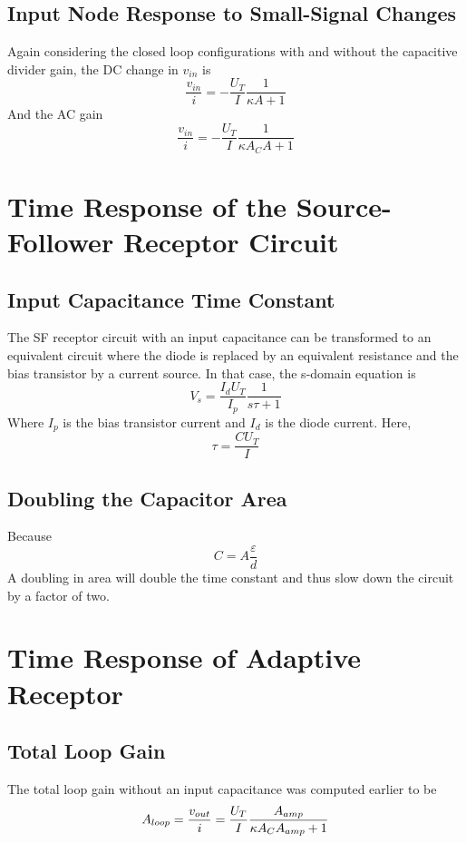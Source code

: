 \subsection{Input Node Response to Small-Signal Changes}
Again considering the closed loop configurations with and without the capacitive divider gain, the DC change in \(v_{in}\) is
\begin{equation*}
    \frac{v_{in}}{i} = -\frac{U_T}{I}\frac{1}{\kappa A +1}
\end{equation*}
And the AC gain
\begin{equation*}
    \frac{v_{in}}{i} = -\frac{U_T}{I}\frac{1}{\kappa A_C A +1}
\end{equation*}

\section{Time Response of the Source-Follower Receptor Circuit}
\subsection{Input Capacitance Time Constant}
The SF receptor circuit with an input capacitance can be transformed to an equivalent circuit where the diode is replaced by 
an equivalent resistance and the bias transistor by a current source. In that case, the s-domain equation is
\begin{equation*}
    V_s = \frac{I_dU_T}{I_p} \frac{1}{s\tau +1}
\end{equation*}
Where \(I_p\) is the bias transistor current and \(I_d\) is the diode current. Here,
\begin{equation*}
    \tau = \frac{CU_T}{I}
\end{equation*}

\subsection{Doubling the Capacitor Area}
Because
\begin{equation*}
    C = A\frac{\varepsilon}{d}
\end{equation*}
A doubling in area will double the time constant and thus slow down the circuit by a factor of two.

\section{Time Response of Adaptive Receptor}
\subsection{Total Loop Gain}
The total loop gain without an input capacitance was computed earlier to be
\begin{equation*}
    A_{loop} = \frac{v_{out}}{i} =\frac{U_T}{I} \frac{A_{amp}}{\kappa A_C A_{amp}+1} \\
\end{equation*}

